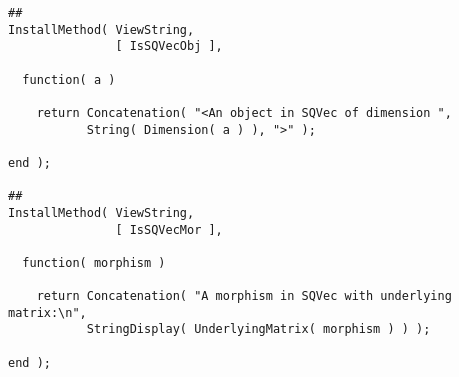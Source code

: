 \begin{small}
\begin{Verbatim}[frame=single]
##
InstallMethod( ViewString,
               [ IsSQVecObj ],

  function( a )

    return Concatenation( "<An object in SQVec of dimension ",
           String( Dimension( a ) ), ">" );

end );

##
InstallMethod( ViewString,
               [ IsSQVecMor ],

  function( morphism )

    return Concatenation( "A morphism in SQVec with underlying matrix:\n",
           StringDisplay( UnderlyingMatrix( morphism ) ) );

end );
\end{Verbatim}
\end{small}
